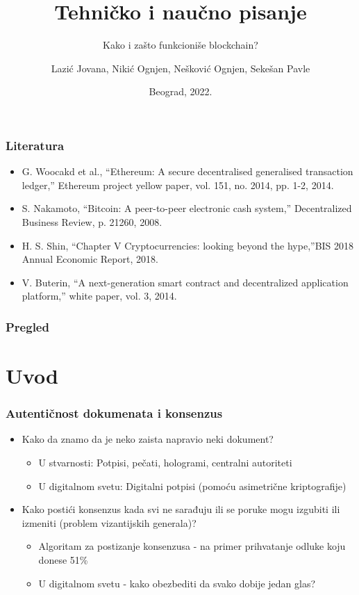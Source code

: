 \documentclass{beamer}
\title{Tehničko i naučno pisanje}
\subtitle{Kako i zašto funkcioniše blockchain?}
\author{Lazić Jovana, Nikić Ognjen, Nešković Ognjen, Sekešan Pavle}
\institute{Matematički fakultet\\Univerzitet u Beogradu}
\date{
	\footnotesize{Beograd, 2022.}	
}
\begin{document}
\begin{frame}
	\thispagestyle{empty}
	\titlepage
\end{frame}

\addtocounter{framenumber}{-1}

\begin{frame}[fragile]\frametitle{Literatura}
	\begin{itemize}
		\item G. Woocakd et al., “Ethereum: A secure decentralised generalised transaction ledger,” Ethereum project yellow paper, vol. 151, no. 2014, pp. 1-2, 2014.
		\item S. Nakamoto, “Bitcoin: A peer-to-peer electronic cash system,” Decentralized Business Review, p. 21260, 2008.
		\item H. S. Shin, “Chapter V Cryptocurrencies: looking beyond the hype,”BIS 2018 Annual Economic Report, 2018.
		\item V. Buterin, “A next-generation smart contract and decentralized application platform,” white paper, vol. 3, 2014.
	\end{itemize}
\end{frame}

\begin{frame}
	\frametitle{Pregled} %
	\tableofcontents[hidesubsections] 
\end{frame}

\section{Uvod}

\begin{frame}[fragile]\frametitle{Autentičnost dokumenata i konsenzus}
	\begin{itemize}
		\item Kako da znamo da je neko zaista napravio neki dokument?
		\begin{itemize}
			\item U stvarnosti: Potpisi, pečati, hologrami, centralni autoriteti 
			\item U digitalnom svetu: Digitalni potpisi (pomoću asimetrične kriptografije) 
		\end{itemize}
		\item Kako postići konsenzus kada svi ne sarađuju ili se poruke mogu izgubiti ili izmeniti (problem vizantijskih generala)?
		\begin{itemize}
			\item Algoritam za postizanje konsenzusa - na primer prihvatanje odluke koju donese 51\%
			\item U digitalnom svetu - kako obezbediti da svako dobije jedan glas?
		\end{itemize}

	\end{itemize}
\end{frame}
\end{document}
